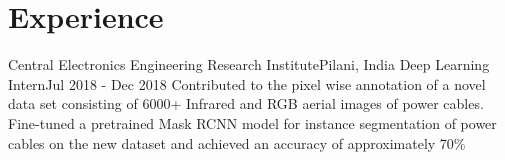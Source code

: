 \section{Experience}
  \resumeSubHeadingListStart
  
    \resumeSubheading
      {Central Electronics Engineering Research Institute}{Pilani, India}
      {Deep Learning Intern}{Jul 2018 - Dec 2018}
      \resumeItemListStart
          {Contributed to the pixel wise annotation of a novel data set consisting of 6000+ Infrared and RGB aerial images of power cables.}
          {Fine-tuned a pretrained Mask RCNN model for instance segmentation of power cables on the new dataset and achieved an accuracy of approximately 70\%}
      \resumeItemListEnd

  \resumeSubHeadingListEnd
